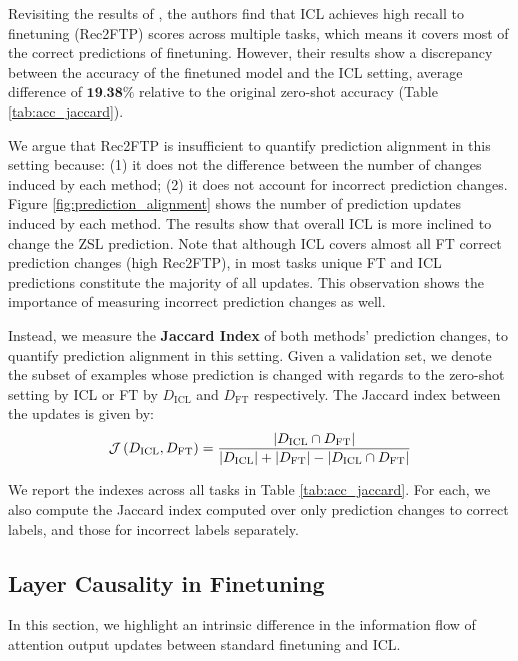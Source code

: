 Revisiting the results of \cite{dai2023gpt}, the authors find that ICL achieves high recall to finetuning (Rec2FTP) scores across multiple tasks, which means it covers most of the correct predictions of finetuning. 
However, their results show a discrepancy between the accuracy of the finetuned model and the ICL setting, average difference of $\textbf{19.38\%}$ relative to the original zero-shot accuracy (Table \ref{tab:acc_jaccard}).


We argue that Rec2FTP is insufficient to quantify prediction alignment in this setting because:
(1) it does not the difference between the number of changes induced by each method;
(2) it does not account for incorrect prediction changes.
Figure \ref{fig:prediction_alignment} shows the number of prediction updates induced by each method.
The results show that overall ICL is more inclined to change the ZSL prediction.
Note that although ICL covers almost all FT correct prediction changes (high Rec2FTP), in most tasks unique FT and ICL predictions constitute the majority of all updates.
This observation shows the importance of measuring incorrect prediction changes as well.

Instead, we measure the \textbf{Jaccard Index} of both methods' prediction changes, to quantify prediction alignment in this setting.
Given a validation set, we denote the subset of examples whose prediction is changed with regards to the zero-shot setting by ICL or FT by $D_\text{ICL}$ and $D_\text{FT}$ respectively.
The Jaccard index between the updates is given by: 
\begin{equation*}
  \mathcal{J}\left( D_\text{ICL}, D_\text{FT} \right) = \frac{\left|D_\text{ICL} \cap D_\text{FT}\right|}{\left|D_\text{ICL}\right| + \left|D_\text{FT}\right| - \left|D_\text{ICL} \cap D_\text{FT}\right|} 
\end{equation*}

We report the indexes across all tasks in Table \ref{tab:acc_jaccard}.
For each, we also compute the Jaccard index computed over only prediction changes to correct labels, and those for incorrect labels separately.


\subsection{Layer Causality in Finetuning}
\label{sec:layer_causality}

In this section, we highlight an intrinsic difference in the information flow of attention output updates between standard finetuning and ICL.

